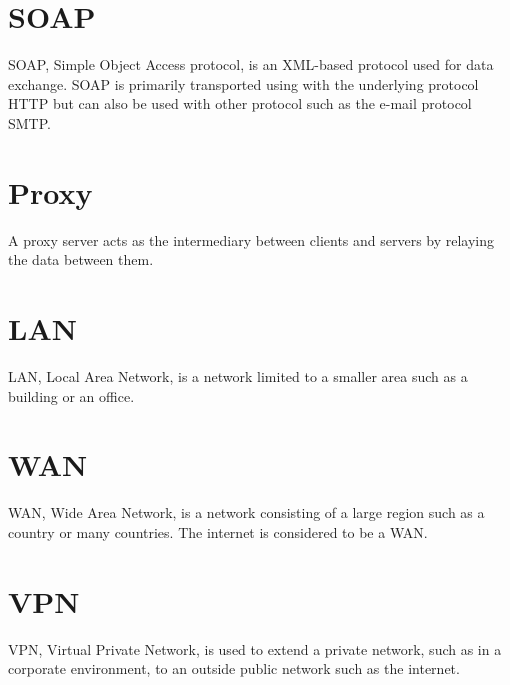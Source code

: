 \documentclass{cslthse-msc}
\begin{document}
\begin{appendices}
\section{SOAP}
SOAP, Simple Object Access protocol, is an XML-based protocol used for data exchange. SOAP is primarily transported using with the underlying protocol HTTP but can also be used with other protocol such as the e-mail protocol SMTP.

\section{Proxy}
A proxy server acts as the intermediary between clients and servers by relaying the data between them.

\section{LAN}
LAN, Local Area Network, is a network limited to a smaller area such as a building or an office.

\section{WAN}
WAN, Wide Area Network, is a network consisting of a large region such as a country or many countries. The internet is considered to be a WAN.

\section{VPN}
VPN, Virtual Private Network, is used to extend a private network, such as in a corporate environment, to an outside public network such as the internet.

\end{appendices}

\end{document}
